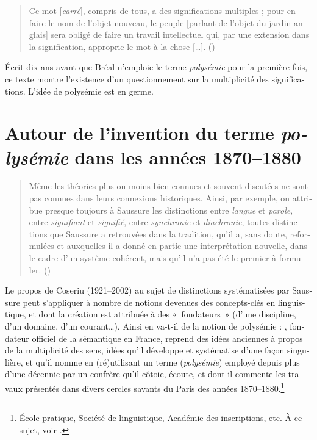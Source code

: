 \documentclass[french,output=paper,colorlinks,citecolor=brown]{../langscibook}
\begin{document}
\begin{otherlanguage}{french}
\begin{quote}
Ce mot [\textit{carré}], compris de tous, a des significations multiples ; pour en faire le nom de l’objet nouveau, le peuple [parlant de l’objet du jardin anglais] sera obligé de faire un travail intellectuel qui, par une extension dans la signification, approprie le mot à la chose […]. (\citealt[33]{Darmesteter1877})
\end{quote}

Écrit dix ans avant que Bréal n’emploie le terme \textit{polysémie} pour la première fois, ce texte montre l’existence d’un questionnement sur la multiplicité des significations. L’idée de polysémie est en germe.

\section{Autour de l’invention du terme \textit{polysémie} dans les années 1870--1880}

\begin{quote}        
Même les théories plus ou moins bien connues et souvent discutées ne sont pas connues dans leurs connexions historiques. Ainsi, par exemple, on attribue presque toujours à Saussure les distinctions entre \textit{langue} et \textit{parole}, entre \textit{signifiant} et \textit{signifié}, entre \textit{synchronie} et \textit{diachronie}, toutes distinctions que Saussure a retrouvées dans la tradition, qu’il a, sans doute, reformulées et auxquelles il a donné en partie une interprétation nouvelle, dans le cadre d’un système cohérent, mais qu’il n’a pas été le premier à formuler. (\citealt[74]{Coseriu1967})
\end{quote}

Le propos de Coseriu (1921--2002) au sujet de distinctions systématisées par Saussure peut s’appliquer à nombre de notions devenues des concepts-clés en linguistique, et dont la création est attribuée à des «~fondateurs~» (d’une discipline, d’un domaine, d’un courant…). Ainsi en va-t-il de la notion de polysémie : \citet{Bréal1897}, fondateur officiel de la sémantique en France, reprend des idées anciennes à propos de la multiplicité des sens, idées qu’il développe et systématise d’une façon singulière, et qu’il nomme en (ré)utilisant un terme (\textit{polysémie}) employé depuis plus d’une décennie par un confrère qu’il côtoie, écoute, et dont il commente les travaux présentés dans divers cercles savants du Paris des années 1870--1880.\footnote{École pratique, Société de linguistique, Académie des inscriptions, etc. À ce sujet, voir \citet{Courbon2015}.}


\end{otherlanguage}
\end{document}
